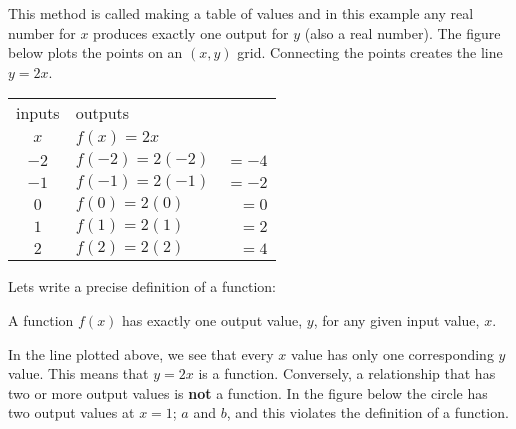 This method is called making a table of values and in this example any real number for $x$ produces exactly one output for $y$ (also a real number). The figure below plots the points on an $(x,y)$ grid. Connecting the points creates the line $y=2x$.

\begin{multicols}{2}
\begin{center}
\begin{tabular}{clr}
	\toprule
	inputs&outputs&\\
$x$&$f(x)=2x$& \\
	\midrule
	$-2$    & $f(-2)=2(-2)$&$=-4$\\
	\midrule
$-1$ & $f(-1)=2(-1)$&$=-2$ \\
\midrule
$0$ & $f(0)=2(0)$&$=0$ \\
\midrule
$1$ & $f(1)=2(1)$&$=2$ \\
\midrule
$2$ & $f(2)=2(2)$&$=4$ \\
	\bottomrule
\end{tabular}
\end{center}
\columnbreak
\begin{center}
\end{center}
\end{multicols}
\vspace{-0.5cm}
Lets write a precise definition of a function:
\begin{tcolorbox}\begin{center}
	A function $f(x)$ has exactly one output value, $y$, for any given input value, $x$.
\end{center}\end{tcolorbox}
In the line plotted above, we see that every $x$ value has only one corresponding $y$ value. This means that $y=2x$ is a function. Conversely, a relationship that has two or more output values is \textbf{not} a function. In the figure below the circle has two output values at $x=1$; $a$ and $b$, and this violates the definition of a function.


